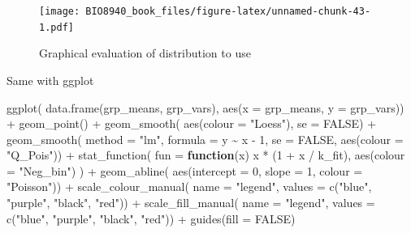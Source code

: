 \documentclass[
  12pt,
]{book}
\newenvironment{Shaded}{\begin{snugshade}}{\end{snugshade}}
\newcommand{\AttributeTok}[1]{\textcolor[rgb]{0.77,0.63,0.00}{#1}}
\newcommand{\ConstantTok}[1]{\textcolor[rgb]{0.00,0.00,0.00}{#1}}
\newcommand{\ControlFlowTok}[1]{\textcolor[rgb]{0.13,0.29,0.53}{\textbf{#1}}}
\newcommand{\DecValTok}[1]{\textcolor[rgb]{0.00,0.00,0.81}{#1}}
\newcommand{\FunctionTok}[1]{\textcolor[rgb]{0.00,0.00,0.00}{#1}}
\newcommand{\NormalTok}[1]{#1}
\newcommand{\SpecialCharTok}[1]{\textcolor[rgb]{0.00,0.00,0.00}{#1}}
\newcommand{\StringTok}[1]{\textcolor[rgb]{0.31,0.60,0.02}{#1}}
\begin{document}
\begin{figure}
\centering
\texttt{[image: BIO8940\_book\_files/figure-latex/unnamed-chunk-43-1.pdf]}
\caption{\label{fig:unnamed-chunk-43}Graphical evaluation of distribution to use}
\end{figure}

Same with ggplot

\begin{Shaded}
\begin{Highlighting}[]
\FunctionTok{ggplot}\NormalTok{(}
  \FunctionTok{data.frame}\NormalTok{(grp\_means, grp\_vars),}
  \FunctionTok{aes}\NormalTok{(}\AttributeTok{x =}\NormalTok{ grp\_means, }\AttributeTok{y =}\NormalTok{ grp\_vars)) }\SpecialCharTok{+}
  \FunctionTok{geom\_point}\NormalTok{() }\SpecialCharTok{+}
  \FunctionTok{geom\_smooth}\NormalTok{(}
    \FunctionTok{aes}\NormalTok{(}\AttributeTok{colour =} \StringTok{"Loess"}\NormalTok{), }\AttributeTok{se =} \ConstantTok{FALSE}\NormalTok{) }\SpecialCharTok{+}
  \FunctionTok{geom\_smooth}\NormalTok{(}
    \AttributeTok{method =} \StringTok{"lm"}\NormalTok{, }\AttributeTok{formula =}\NormalTok{ y }\SpecialCharTok{\textasciitilde{}}\NormalTok{ x }\SpecialCharTok{{-}} \DecValTok{1}\NormalTok{, }\AttributeTok{se =} \ConstantTok{FALSE}\NormalTok{,}
    \FunctionTok{aes}\NormalTok{(}\AttributeTok{colour =} \StringTok{"Q\_Pois"}\NormalTok{)) }\SpecialCharTok{+}
  \FunctionTok{stat\_function}\NormalTok{(}
    \AttributeTok{fun =} \ControlFlowTok{function}\NormalTok{(x) x }\SpecialCharTok{*}\NormalTok{ (}\DecValTok{1} \SpecialCharTok{+}\NormalTok{ x }\SpecialCharTok{/}\NormalTok{ k\_fit),}
    \FunctionTok{aes}\NormalTok{(}\AttributeTok{colour =} \StringTok{"Neg\_bin"}\NormalTok{)}
\NormalTok{  ) }\SpecialCharTok{+}
  \FunctionTok{geom\_abline}\NormalTok{(}
    \FunctionTok{aes}\NormalTok{(}\AttributeTok{intercept =} \DecValTok{0}\NormalTok{, }\AttributeTok{slope =} \DecValTok{1}\NormalTok{, }\AttributeTok{colour =} \StringTok{"Poisson"}\NormalTok{)) }\SpecialCharTok{+}
  \FunctionTok{scale\_colour\_manual}\NormalTok{(}
    \AttributeTok{name =} \StringTok{"legend"}\NormalTok{,}
    \AttributeTok{values =} \FunctionTok{c}\NormalTok{(}\StringTok{"blue"}\NormalTok{, }\StringTok{"purple"}\NormalTok{, }\StringTok{"black"}\NormalTok{, }\StringTok{"red"}\NormalTok{)) }\SpecialCharTok{+}
  \FunctionTok{scale\_fill\_manual}\NormalTok{(}
    \AttributeTok{name =} \StringTok{"legend"}\NormalTok{,}
    \AttributeTok{values =} \FunctionTok{c}\NormalTok{(}\StringTok{"blue"}\NormalTok{, }\StringTok{"purple"}\NormalTok{, }\StringTok{"black"}\NormalTok{, }\StringTok{"red"}\NormalTok{)) }\SpecialCharTok{+}
  \FunctionTok{guides}\NormalTok{(}\AttributeTok{fill =} \ConstantTok{FALSE}\NormalTok{)}
\end{Highlighting}
\end{Shaded}
\end{document}
